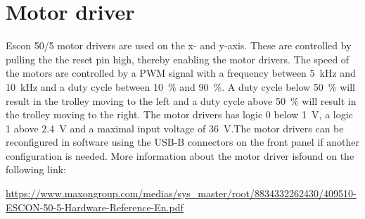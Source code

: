 \section{Motor driver}
Escon 50/5 motor drivers are used on the x- and y-axis. These are controlled by pulling the the reset pin high, thereby enabling the motor drivers. The speed of the motors are controlled by a PWM signal with a frequency between \SI{5}{kHz} and \SI{10}{kHz} and a duty cycle between \SI{10}{\percent} and \SI{90}{\percent}. A duty cycle below \SI{50}{\percent} will result in the trolley moving to the left and a duty cycle above \SI{50}{\percent} will result in the trolley moving to the right. The motor drivers has logic 0 below \SI{1}{\volt}, a logic 1 above \SI{2.4}{\volt} and a maximal input voltage of \SI{36}{\volt}.The motor drivers can be reconfigured in software using the USB-B connectors on the front panel if another configuration is needed. More information about the motor driver isfound on the following link:

\url{https://www.maxongroup.com/medias/sys_master/root/8834332262430/409510-ESCON-50-5-Hardware-Reference-En.pdf}